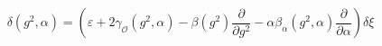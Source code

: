 \begin{equation}  \label{d2}
\delta(g^{2},\alpha)=\left(\varepsilon+2\gamma_{\mathcal{O}%
}(g^{2},\alpha)-\beta(g^{2})\frac{\partial }{\partial g^{2}}%
-\alpha\beta_{\alpha}(g^{2},\alpha)\frac{\partial}{\partial\alpha}%
\right)\delta\xi
\end{equation}

